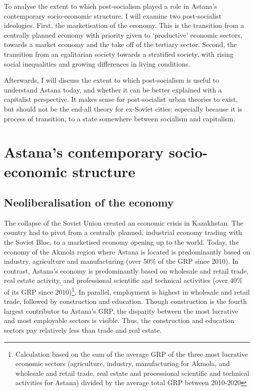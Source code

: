 \documentclass{article}
\begin{document}
To analyse the extent to which post-socialism played a role in Astana's contemporary socio-economic structure, I will examine two post-socialist ideologies. 
First, the marketisation of the economy. This is the transition from a centrally planned economy with priority given to `productive' economic sectors, towards a market economy and the take off of the tertiary sector. 
Second, the transition from an egalitarian society towards a stratified society, with rising social inequalities and growing differences in living conditions.

Afterwards, I will discuss the extent to which post-socialism is useful to understand Astana today, and whether it can be better explained with a capitalist perspective. It makes sense for post-socialist urban theories to exist, but should not be the end-all theory for ex-Soviet cities; especially because it is process of transition, to a state somewhere between socialism and capitalism.

\section{Astana's contemporary socio-economic structure}

\subsection{Neoliberalisation of the economy}

The collapse of the Soviet Union created an economic crisis in Kazakhstan. The country had to pivot from a centrally planned, industrial economy trading with the Soviet Bloc, to a marketised economy opening up to the world. Today, the economy of the Akmola region where Astana is located is predominantly based on industry, agriculture and manufacturing (over 50\% of the GRP since 2010). In contrast, Astana's economy is predominantly based on wholesale and retail trade, real estate activity, and professional scientific and technical activities (over 40\% of its GRP since 2010)\footnote{Calculation based on the sum of the average GRP of the three most lucrative economic sectors (agriculture, industry, manufacturing for Akmola, and wholesale and retail trade, real estate and processional scientific and technical activities for Astana) divided by the average total GRP between 2010-2020}. In parallel, employment is highest in wholesale and retail trade, followed by construction and education. Though construction is the fourth largest contributor to Astana's GRP, the disparity between the most lucrative and most employable sectors is visible. Thus, the construction and education sectors pay relatively less than trade and real estate.
\end{document}
